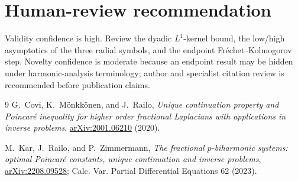\documentclass[11pt]{article}
\begin{document}
\section*{Human-review recommendation}

Validity confidence is high.  Review the dyadic \(L^1\)-kernel bound, the
low/high asymptotics of the three radial symbols, and the endpoint
Fr\'echet--Kolmogorov step.  Novelty confidence is moderate because an
endpoint result may be hidden under harmonic-analysis terminology; author
and specialist citation review is recommended before publication claims.

\begin{thebibliography}{9}
G.~Covi, K.~M\"onkk\"onen, and J.~Railo,
\emph{Unique continuation property and Poincar\'e inequality for higher
order fractional Laplacians with applications in inverse problems},
\href{https://arxiv.org/abs/2001.06210}{arXiv:2001.06210} (2020).

M.~Kar, J.~Railo, and P.~Zimmermann,
\emph{The fractional \(p\)-biharmonic systems: optimal Poincar\'e constants,
unique continuation and inverse problems},
\href{https://arxiv.org/abs/2208.09528}{arXiv:2208.09528};
Calc. Var. Partial Differential Equations 62 (2023).
\end{thebibliography}
\end{document}
